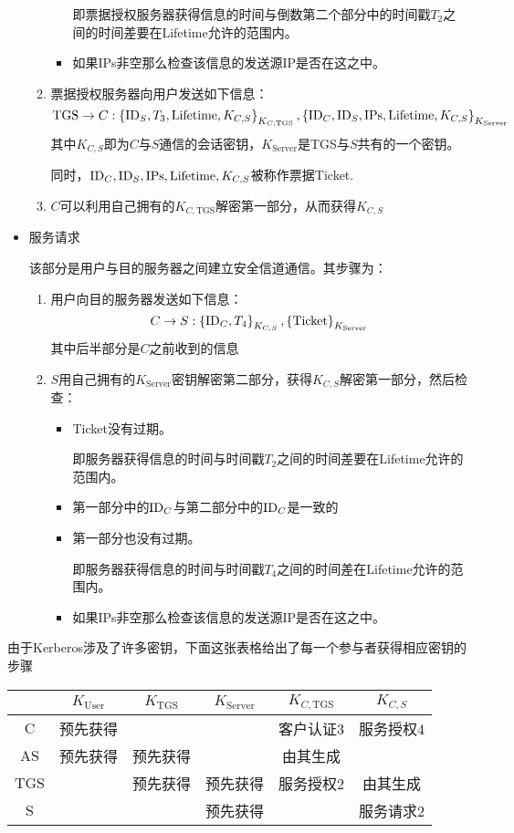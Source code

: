 \begin{itemize}
\begin{enumerate}
\begin{itemize}
			即票据授权服务器获得信息的时间与倒数第二个部分中的时间戳$T_2$之间的时间差要在Lifetime允许的范围内。
			\item 如果IPs非空那么检查该信息的发送源IP是否在这之中。
		\end{itemize}
		\item 票据授权服务器向用户发送如下信息：
		\[\mathrm{TGS}\to C: \left\{ {\mathrm{ID}_S, T_3, \mathrm{Lifetime}, K_{C, S}} \right\}_{K_{C, \mathrm{TGS}}}, \left\{ {\mathrm{ID}_C, \mathrm{ID}_S, \mathrm{IPs}, \mathrm{Lifetime}, K_{C, S}} \right\}_{K_{\mathrm{Server}}}\]
		其中$K_{C, S}$即为$C$与$S$通信的会话密钥，$K_{\mathrm{Server}}$是TGS与$S$共有的一个密钥。\par
		同时，$\mathrm{ID}_C, \mathrm{ID}_S, \mathrm{IPs}, \mathrm{Lifetime}, K_{C, S}$被称作票据Ticket.
		\item $C$可以利用自己拥有的$K_{C, \mathrm{TGS}}$解密第一部分，从而获得$K_{C, S}$
	\end{enumerate}
	\item 服务请求\par
	该部分是用户与目的服务器之间建立安全信道通信。其步骤为：
	\begin{enumerate}
		\item 用户向目的服务器发送如下信息：
		\[C\to S: \left\{ {\mathrm{ID}_C, T_4} \right\}_{K_{C, S}}, \left\{ {\mathrm{Ticket}} \right\}_{K_{\mathrm{Server}}}\]
		其中后半部分是$C$之前收到的信息
		\item $S$用自己拥有的$K_{\mathrm{Server}}$密钥解密第二部分，获得$K_{C, S}$解密第一部分，然后检查：
		\begin{itemize}
			\item Ticket没有过期。\par
			即服务器获得信息的时间与时间戳$T_2$之间的时间差要在Lifetime允许的范围内。
			\item 第一部分中的$\mathrm{ID}_C$与第二部分中的$\mathrm{ID}_C$是一致的
			\item 第一部分也没有过期。\par
			即服务器获得信息的时间与时间戳$T_4$之间的时间差在Lifetime允许的范围内。
			\item 如果IPs非空那么检查该信息的发送源IP是否在这之中。
		\end{itemize}
	\end{enumerate}	
\end{itemize}

由于Kerberos涉及了许多密钥，下面这张表格给出了每一个参与者获得相应密钥的步骤
\begin{table}[H]
\centering
\begin{tabular}{c|c|c|c|c|c}\hline
&$K_{\mathrm{User}}$&$K_{\mathrm{TGS}}$&$K_{\mathrm{Server}}$&$K_{C, \mathrm{TGS}}$&$K_{C, S}$\\\hline
C&预先获得&&&客户认证3&服务授权4\\\hline
AS&预先获得&预先获得&&由其生成&\\\hline
TGS&&预先获得&预先获得&服务授权2&由其生成\\\hline
S&&&预先获得&&服务请求2\\\hline
\end{tabular}
\end{table}
